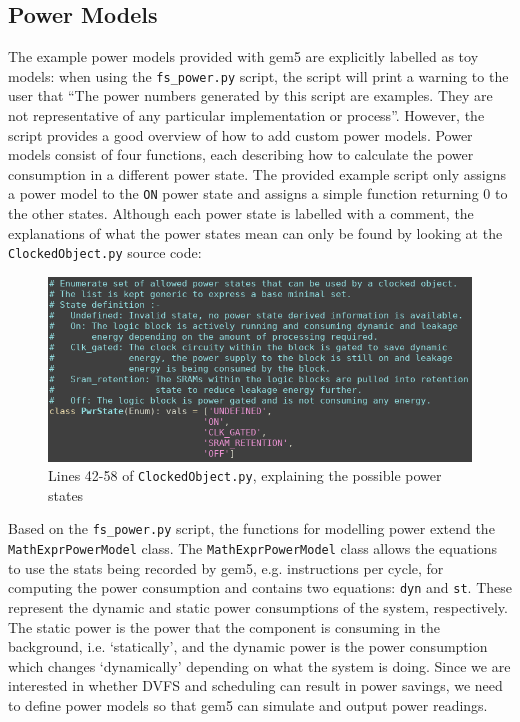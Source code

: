     \subsection{Power Models}
    The example power models provided with gem5 are explicitly labelled as toy
    models: when using the \texttt{fs\_power.py} script, the script will print a
    warning to the user that ``The power numbers generated by this script are 
    examples. They are not representative of any particular implementation or 
    process''. However, the script provides a good overview of how to add custom
    power models. Power models consist of four functions, each describing how
    to calculate the power consumption in a different power state. The provided 
    example script only assigns a power model to the \texttt{ON} power state and
    assigns a simple function returning 0 to the other states. Although each
    power state is labelled with a comment, the explanations of what the power
    states mean can only be found by looking at the \texttt{ClockedObject.py}
    source code:
    \begin{figure}[H]
        \centering
        \includegraphics[width=0.9\linewidth]{screenshots/power-states/details.png}
        \caption{Lines 42-58 of \texttt{ClockedObject.py}, explaining the
                 possible power states}
    \end{figure}
    Based on the \texttt{fs\_power.py} script, the functions for modelling power
    extend the \texttt{MathExprPowerModel} class. The 
    \texttt{MathExprPowerModel} class allows the equations to use the stats 
    being recorded by gem5, e.g. instructions per cycle, for computing the 
    power consumption \cite{bischoff_gem5_2017-1} and contains two equations: 
    \texttt{dyn} and \texttt{st}. These represent the dynamic and static power 
    consumptions of the system, respectively. The static power is the power that
    the component is consuming in the background, i.e. `statically', and the
    dynamic power is the power consumption which changes `dynamically' depending
    on what the system is doing. Since we are interested in whether DVFS and 
    scheduling can result in power savings, we need to define power models so 
    that gem5 can simulate and output power readings.
    
